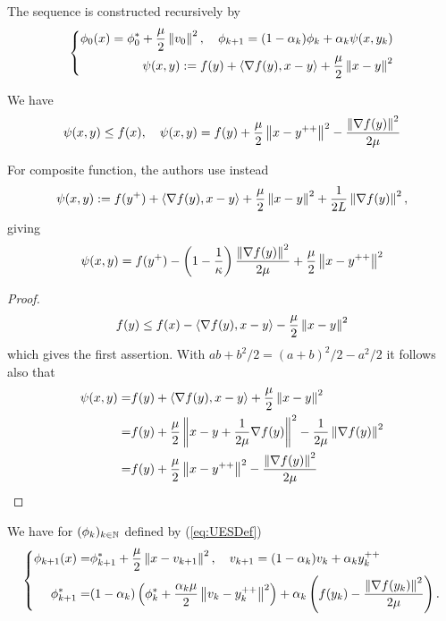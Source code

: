 \documentclass[12pt,english]{article}
\begin{document}
The sequence is constructed recursively by
%
\begin{equation}\label{eq:UESDef}
%
\left\{
\begin{aligned}
\phi_0(x) = \phi^*_0 + \frac{\mu}{2}\norm{v_0}^2,\quad \phi_{k+1} = (1-\alpha_k)\phi_k + \alpha_k \psi(x, y_k)\\
\psi(x, y) := f(y) + \scp{\nabla f(y)}{x-y}+\frac{\mu}{2}\norm{x-y}^2
\end{aligned}
\right.
\end{equation}
%
\begin{lemma}\label{lemma:}
We have
%
\begin{equation}\label{eq:uas_help22}
\psi(x, y) \le f(x),\quad \psi(x, y) = f(y)  + \frac{\mu}{2}\left\|x-y^{++}\right\|^2 - \frac{\left\|\nabla f(y)\right\|^2}{2\mu}
\end{equation}
%
\end{lemma}
%
\begin{remark}\label{rmk:}
For composite function, the authors use instead
%
\begin{align*}
\psi(x, y) := f(y^+) + \langle\nabla f(y),x-y\rangle+\frac{\mu}{2}\left\|x-y\right\|^2+\frac{1}{2L}\left\|\nabla f(y)\right\|^2,
\end{align*}
%
giving
%
\begin{align*}
\psi(x, y) = f(y^+) - \left(1-\frac{1}{\kappa}\right)\frac{\left\|\nabla f(y)\right\|^2}{2\mu} + \frac{\mu}{2}\left\|x-y^{++}\right\|^2
\end{align*}
%


\end{remark}
%
\begin{proof}
%
\begin{align*}
f(y)  \le f(x) - \langle\nabla f(y),x-y\rangle - \frac{\mu}{2}\left\|x-y\right\|^2
\end{align*}
%
which gives the first assertion. With $ab+b^2/2 = (a+b)^2/2 - a^2/2$ it follows also that
%
%
\begin{align*}
\psi(x, y) =& f(y) + \langle\nabla f(y),x-y\rangle+\frac{\mu}{2}\left\|x-y\right\|^2\\
=& f(y) + \frac{\mu}{2}\left\|x-y+\frac{1}{2\mu}\nabla f(y)\right\|^2-\frac{1}{2\mu}\left\|\nabla f(y)\right\|^2\\
=& f(y) + \frac{\mu}{2}\left\|x-y^{++}\right\|^2-\frac{\left\|\nabla f(y)\right\|^2}{2\mu}
\end{align*}
%
%
\end{proof}
%
\begin{lemma}\label{lemma:}
We have for $(\phi_k)_{k\in\mathbb N}$ defined by (\ref{eq:UESDef})
%
\begin{equation}\label{eq:ues_recphi}
%
\left\{
\begin{aligned}
\phi_{k+1}(x) =& \phi_{k+1}^* + \frac{\mu}{2}\norm{x-v_{k+1}}^2,\quad 
v_{k+1} = (1-\alpha_k)v_k + \alpha_k  y_k^{++}\\
\phi_{k+1}^* =& (1-\alpha_k)\left(\phi_{k}^* + \frac{\alpha_k\mu}{2}\norm{v_k-y_k^{++}}^2\right) + \alpha_k\left(f(y_k) -\frac{\norm{\nabla f(y_k)}^2}{2\mu} \right).
\end{aligned}
\right.
\end{equation}
%
\end{lemma}
\end{document}
